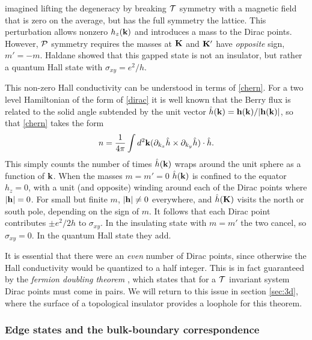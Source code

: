 \documentclass[twocolumn,floatfix,showpacs,rmp,aps]{revtex4}
\begin{document}
	\textcite{haldane88} imagined lifting the degeneracy by breaking ${\cal T}$
	symmetry with a magnetic field that is zero
	on the average, but has the full symmetry the lattice.  This
	perturbation allows nonzero $h_z({\bf k})$ and introduces a mass to
	the Dirac points.  However, $\cal P$ symmetry requires the masses at ${\bf
		K}$ and ${\bf K}'$
	have {\it opposite} sign, $m' = - m$. Haldane showed that this gapped
	state is not an insulator, but rather a quantum Hall state with
	$\sigma_{xy} = e^2/h$.
	
	This non-zero Hall conductivity can be understood in terms of
	\eqref{chern}.  For a two level Hamiltonian of the form of \eqref{dirac} it
	is well known that the Berry flux\cite{berry84} is related to
	the solid angle subtended by the unit vector $\hat h({\bf k}) =
	{\bf h}({\bf k})/|{\bf h}({\bf k})|$, so that \eqref{chern} takes the form
	\begin{equation}
		n = \frac{1}{4\pi}\int d^2{\bf k}
		(\partial_{k_x} \hat h \times \partial_{k_y} \hat h)\cdot \hat h .
	\end{equation}
	This simply counts the number of times $\hat h({\bf k})$ wraps around
	the unit sphere as a function of ${\bf k}$.  When the masses $m=m'=0$
	$\hat h({\bf k})$ is confined to the equator $h_z=0$, with a unit
	(and opposite)
	winding around each of the Dirac points where $|{\bf h}|=0$.
	For small but finite $m$, $|{\bf h}|\ne 0$ everywhere, and $\hat h({\bf K})$
	visits the north or south pole, depending on the sign of $m$.
	It follows that each Dirac point contributes $\pm e^2/2h$ to $\sigma_{xy}$.  In
	the insulating state with $m=m'$ the two cancel, so
	$\sigma_{xy}=0$. In the quantum Hall state they add.
	
	It is essential that there were an {\it even} number of Dirac points, since
	otherwise the Hall conductivity would be quantized to a half integer.  This is
	in fact guaranteed by the {\it fermion doubling theorem} \cite{nielssen83}, which states that for
	a ${\cal T}$ invariant system Dirac points must come in pairs.  We will
	return to this issue in section \ref{sec:3d}, where the surface of a topological
	insulator provides a loophole for this theorem.
	
	
	\subsubsection{Edge states and the bulk-boundary correspondence}
	\label{sec:edge}
	
\end{document}
